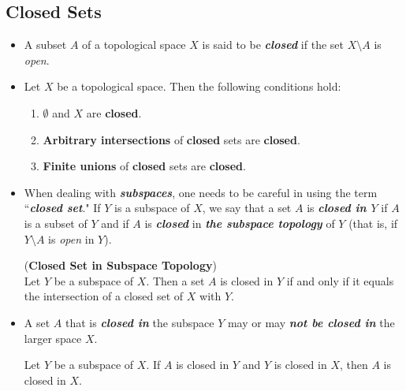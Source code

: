 \documentclass[11pt]{article}
\begin{document}
\subsection{Closed Sets}
\begin{itemize}
\item \begin{definition}
A subset $A$ of a topological space $X$ is said to be \emph{\textbf{closed}} if the set $X \setminus A$ is \emph{open}.
\end{definition}

\item \begin{proposition}
Let $X$ be a topological space. Then the following conditions hold:
\begin{enumerate}
\item $\emptyset$ and $X$ are \textbf{closed}.
\item \textbf{Arbitrary intersections} of \textbf{closed} sets are \textbf{closed}.
\item \textbf{Finite unions} of \textbf{closed} sets are \textbf{closed}.
\end{enumerate}
\end{proposition}

\item \begin{remark}
When dealing with \emph{\textbf{subspaces}}, one needs to be careful in using the term ``\emph{\textbf{closed set}}." If $Y$ is a subspace of $X$, we say that a set $A$ is \emph{\textbf{closed in $Y$}} if $A$ is a subset of $Y$ and if $A$ is \textbf{\emph{closed}} in \emph{\textbf{the subspace topology}} of $Y$ (that is, if $Y \setminus A$ is \emph{open} in $Y$).
\end{remark}

\begin{proposition} (\textbf{Closed Set in Subspace Topology})\\
Let $Y$ be a subspace of $X$. Then a set $A$ is closed in $Y$ if and only if it equals the intersection of a closed set of $X$ with $Y$.
\end{proposition}

\item \begin{remark}
A set $A$ that is \emph{\textbf{closed in}} the subspace $Y$ may or may \emph{\textbf{not be closed in}} the larger space $X$.
\end{remark}

\begin{proposition}
Let $Y$ be a subspace of $X$. If $A$ is closed in $Y$ and $Y$ is closed in $X$, then $A$ is closed in $X$.
\end{proposition}

\end{itemize}
\end{document}
